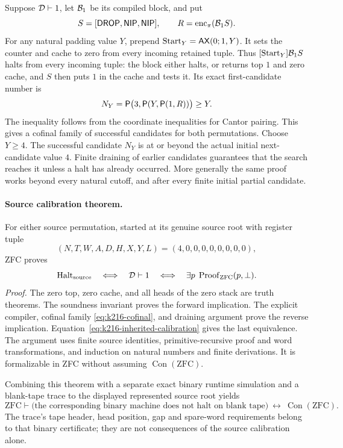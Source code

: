Suppose $\mathcal D\vdash1$, let $\mathcal B_1$ be its compiled block, and put
\[
 S=[\mathsf{DROP},\mathsf{NIP},\mathsf{NIP}],\qquad
 R=\operatorname{enc}_\pi(\mathcal B_1S).
\]
For any natural padding value $Y$, prepend
$\operatorname{Start}_Y=\mathsf{AX}(0;1,Y)$. It sets the counter and cache to
zero from every incoming retained tuple. Thus
$[\operatorname{Start}_Y]\mathcal B_1S$ halts from every incoming tuple:
the block either halts, or returns top $1$ and zero cache, and $S$
then puts $1$ in the cache and tests it.
Its exact first-candidate number is
\begin{equation}
 N_Y=\mathsf P\bigl(3,\mathsf P(Y,\mathsf P(1,R))\bigr)\geq Y.
 \label{eq:k216-cofinal}
\end{equation}
The inequality follows from the coordinate inequalities for Cantor
pairing. This gives a cofinal family of successful candidates for both
permutations. Choose $Y\geq4$. The successful candidate $N_Y$ is at or
beyond the actual initial next-candidate value $4$. Finite draining of
earlier candidates guarantees that the search reaches it unless a halt
has already occurred. More generally the same proof works beyond every
natural cutoff, and after every finite initial partial candidate.

\paragraph{Source calibration theorem.}
For either source permutation, started at its genuine source root with
register tuple
\[
 (N,T,W,A,D,H,X,Y,L)=(4,0,0,0,0,0,0,0,0),
\]
ZFC proves
\[
 \operatorname{Halt}_{\rm source}
 \quad\Longleftrightarrow\quad\mathcal D\vdash1
 \quad\Longleftrightarrow\quad
 \exists p\;\operatorname{Proof}_{\mathrm{ZFC}}(p,\bot).
\]
\emph{Proof.} The zero top, zero cache, and all heads of the zero stack
are truth theorems. The soundness invariant proves the forward
implication. The explicit compiler, cofinal family
\eqref{eq:k216-cofinal}, and draining argument prove the reverse
implication. Equation~\eqref{eq:k216-inherited-calibration} gives the
last equivalence. The argument uses finite source identities,
primitive-recursive proof and word transformations, and induction on
natural numbers and finite derivations. It is formalizable in ZFC
without assuming $\operatorname{Con}(\mathrm{ZFC})$.

Combining this theorem with a separate exact binary runtime simulation
and a blank-tape trace to the displayed represented source root yields
\[
 \mathrm{ZFC}\vdash
 \bigl(\text{the corresponding binary machine does not halt on blank tape}\bigr)
 \ \longleftrightarrow\ \operatorname{Con}(\mathrm{ZFC}).
\]
The trace's tape header, head position, gap and spare-word requirements
belong to that binary certificate; they are not consequences of the
source calibration alone.
\endgroup
